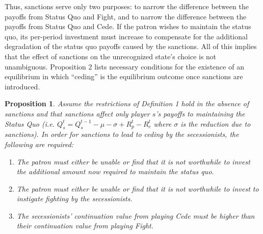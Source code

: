 \documentclass[11pt,letterpaper, notitlepage]{article}
\newtheorem{proposition}{Proposition}
\begin{document}
Thus, sanctions serve only two purposes: to narrow the difference between the payoffs from Status Quo and Fight, and to narrow the difference between the payoffs from Status Quo and Cede. If the patron wishes to maintain the status quo, its per-period investment must increase to compensate for the additional degradation of the status quo payoffs caused by the sanctions. All of this implies that the effect of sanctions on the unrecognized state's choice is not unambiguous. Proposition 2 lists necessary conditions for the existence of an equilibrium in which ``ceding'' is the equilibrium outcome once sanctions are introduced.


\begin{proposition}
Assume the restrictions of \emph{Definition 1} hold in the absence of sanctions and that sanctions affect only player $s$'s payoffs to maintaining the Status Quo (i.e. $Q_s^t = Q_s^{t-1} - \mu -\sigma +R_p^t - R_c^t$ where $\sigma$ is the reduction due to sanctions).  In order for sanctions to lead to ceding by the secessionists, the following are required:

\begin{enumerate}
\item \textit{The patron must either be unable or find that it is not worthwhile to invest the additional amount now required to maintain the status quo.}

\item \textit{The patron must either be unable or find that it is not worthwhile to invest to instigate fighting by the secessionists.}



\item \textit{The secessionists' continuation value from playing Cede must be higher than their continuation value from playing Fight.}
\end{enumerate}

\end{proposition}
\end{document}
